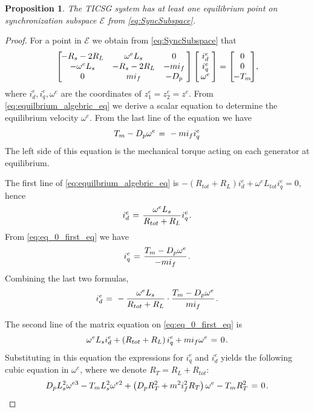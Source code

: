 \documentclass[letterpaper, 10 pt, conference]{ieeeconf}
\newtheorem{proposition}[theorem]{Proposition}
\renewcommand{\o}    {{\omega}}
\newcommand{\m}      {{\hbox{\hskip 1pt}}}
\newcommand{\nm}     {{\hbox{\hskip -3pt}}}
\newcommand{\Emscr}  {{\mathcal{E}}}
\begin{document}
\begin{proposition} \label{EqPointsProp2}
The TICSG system has at least one equilibrium point on
synchronization subspace $\Emscr$ from \eqref{eq:SyncSubspace}.
\end{proposition}

\begin{proof}
For a point in $\Emscr$ we obtain from \eqref{eq:SyncSubspace} that
\begin{equation} \label{eq:equilbrium_algebric_eq}
   \left[\nm\nm\begin{array}{ccc} -R_s-2R_L & \o^e L_s & 0\\
   -\o^e L_s & -R_s-2R_L & -m i_f\\ 0 & m i_f & -D_p
   \end{array} \nm\right] \left[\nm\begin{array}{c} i_d^e\\
   i_q^e\\ \o^e \end{array} \nm\right] = \left[\nm\nm 
   \begin{array}{c} 0\\ 0\\ -T_m\end{array} \nm\nm\right]\nm\m,
\end{equation}
where $i_d^e,i_q^e,\o^e$ are the coordinates of $z_1^e=z_2^e=z^e$.
From \eqref{eq:equilbrium_algebric_eq} we derive a scalar equation to
determine the equilibrium velocity $\omega^{e}$. From the last line of
the equation we have
\begin{equation} \label{eq:eq_0_first_eq}
   T_m-D_p\o^e \m=\m -mi_f i_q^e 
\end{equation}
The left side of this equation is the mechanical torque acting on each
generator at equilibrium.

The first line of \eqref{eq:equilbrium_algebric_eq}
is $-\left(R_{tot}+R_L\right)i_d^e+\o^e L_{tot}i_q^e=0$, \quad hence
$$i_d^e \m=\m \frac{\o^e L_s}{R_{tot}+R_L} i_q^e \m.$$
From \eqref{eq:eq_0_first_eq} we have
$$i_q^e \m=\m \frac{T_m-D_p\o^e}{-mi_f} \m.$$
Combining the last two formulas,
$$ i_{d}^{e} \m=\m -\frac{\o^e L_s}{R_{tot}+R_L} \cdot \frac{T_m-D_p
   \o^e}{mi_f} \m.$$

The second line of the matrix equation on \eqref{eq:eq_0_first_eq} is
$$ \o^{e}L_s i_d^e + \left(R_{tot} + R_L\right) i_q^e + mi_f\o^e 
   \m=\m 0 \m.$$
Substituting in this equation the expressions for $i_q^e$ and
$i_d^e$ yields the following cubic equation in $\o^e$, where
we denote $R_T=R_L+R_{tot}$:
\begin{equation}
 D_p L_s^2\o^{e3}-T_m L_s^2 \o^{e2} +\left(D_p R_T^2+m^2 i_f^2 
   R_T\right) \o^e - T_m R_T^2 \m=\m 0 \m.
\label{eq:cubicEqation}   
\end{equation}


\end{proof}
\end{document}
